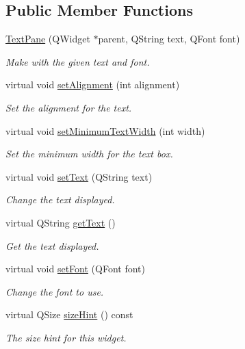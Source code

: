\subsection*{Public Member Functions}
\begin{DoxyCompactItemize}
\item 
\hyperlink{class_u_i_1_1_text_pane_a3643f2741f12dae449e289b8bdc8ebbf}{Text\-Pane} (Q\-Widget $\ast$parent, Q\-String text, Q\-Font font)
\begin{DoxyCompactList}\small\item\em Make with the given text and font. \end{DoxyCompactList}\item 
virtual void \hyperlink{class_u_i_1_1_text_pane_ab86d9fcbc026a0fb53ba9aa04da9d9aa}{set\-Alignment} (int alignment)
\begin{DoxyCompactList}\small\item\em Set the alignment for the text. \end{DoxyCompactList}\item 
virtual void \hyperlink{class_u_i_1_1_text_pane_aea1daba1263ccc6c7c45cab381c80460}{set\-Minimum\-Text\-Width} (int width)
\begin{DoxyCompactList}\small\item\em Set the minimum width for the text box. \end{DoxyCompactList}\item 
virtual void \hyperlink{class_u_i_1_1_text_pane_a2b477b3f15d7ef2f65b0c7cd3ac6c109}{set\-Text} (Q\-String text)
\begin{DoxyCompactList}\small\item\em Change the text displayed. \end{DoxyCompactList}\item 
virtual Q\-String \hyperlink{class_u_i_1_1_text_pane_ac9886bbb5daf0f0a88663e1f253d8c7c}{get\-Text} ()
\begin{DoxyCompactList}\small\item\em Get the text displayed. \end{DoxyCompactList}\item 
virtual void \hyperlink{class_u_i_1_1_text_pane_afccfef1729fb7458c8c5644f446a25c8}{set\-Font} (Q\-Font font)
\begin{DoxyCompactList}\small\item\em Change the font to use. \end{DoxyCompactList}\item 
virtual Q\-Size \hyperlink{class_u_i_1_1_text_pane_a5f902b1dae02e52e126b0c5af9ade63f}{size\-Hint} () const 
\begin{DoxyCompactList}\small\item\em The size hint for this widget. \end{DoxyCompactList}\end{DoxyCompactItemize}
